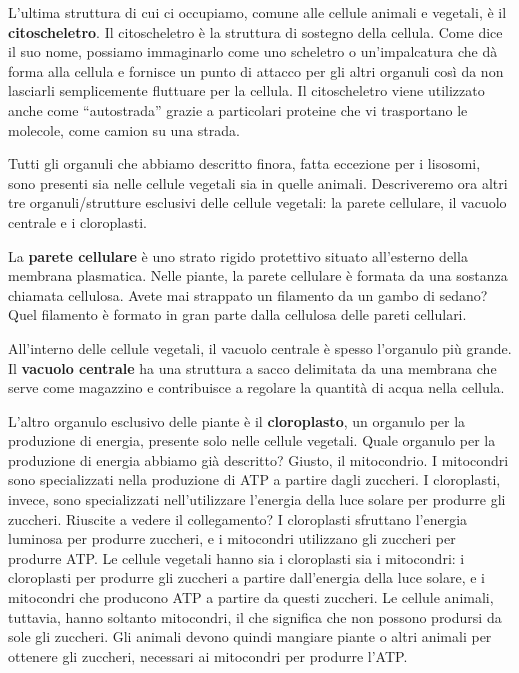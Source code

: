 \documentclass[a4paper]{article}
\begin{document}
L'ultima struttura di cui ci occupiamo, comune alle cellule animali e vegetali, è il
\textbf{citoscheletro}. Il citoscheletro è la struttura di sostegno della cellula. Come dice il suo nome,
possiamo immaginarlo come uno scheletro o un'impalcatura che dà forma alla cellula e
fornisce un punto di attacco per gli altri organuli così da non lasciarli semplicemente fluttuare
per la cellula. Il citoscheletro viene utilizzato anche come “autostrada” grazie a particolari
proteine che vi trasportano le molecole, come camion su una strada.

Tutti gli organuli che abbiamo descritto finora, fatta eccezione per i lisosomi, sono presenti
sia nelle cellule vegetali sia in quelle animali. Descriveremo ora altri tre organuli/strutture
esclusivi delle cellule vegetali: la parete cellulare, il vacuolo centrale e i cloroplasti.

La \textbf{parete cellulare} è uno strato rigido protettivo situato all'esterno della membrana
plasmatica. Nelle piante, la parete cellulare è formata da una sostanza chiamata cellulosa.
Avete mai strappato un filamento da un gambo di sedano? Quel filamento è formato in gran
parte dalla cellulosa delle pareti cellulari.

All'interno delle cellule vegetali, il vacuolo centrale è spesso l'organulo più grande. Il
\textbf{vacuolo centrale} ha una struttura a sacco delimitata da una membrana che serve come
magazzino e contribuisce a regolare la quantità di acqua nella cellula.

L'altro organulo esclusivo delle piante è il \textbf{cloroplasto}, un organulo per la produzione di
energia, presente solo nelle cellule vegetali. Quale organulo per la produzione di energia
abbiamo già descritto? Giusto, il mitocondrio. I mitocondri sono specializzati nella
produzione di ATP a partire dagli zuccheri. I cloroplasti, invece, sono specializzati
nell'utilizzare l'energia della luce solare per produrre gli zuccheri. Riuscite a vedere il
collegamento? I cloroplasti sfruttano l'energia luminosa per produrre zuccheri, e i mitocondri
utilizzano gli zuccheri per produrre ATP. Le cellule vegetali hanno sia i cloroplasti sia i
mitocondri: i cloroplasti per produrre gli zuccheri a partire dall'energia della luce solare, e i
mitocondri che producono ATP a partire da questi zuccheri. Le cellule animali, tuttavia,
hanno soltanto mitocondri, il che significa che non possono prodursi da sole gli zuccheri. Gli
animali devono quindi mangiare piante o altri animali per ottenere gli zuccheri, necessari ai
mitocondri per produrre l'ATP.
\end{document}
